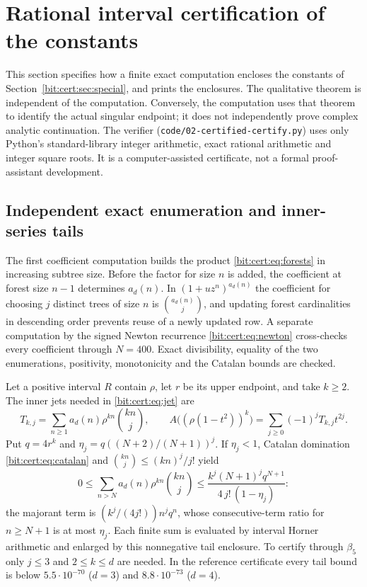 \documentclass[11pt]{article}
\theoremstyle{definition}\newtheorem{definition}[theorem]{Definition}
\theoremstyle{remark}\newtheorem{remark}[theorem]{Remark}
\begin{document}
\section{Rational interval certification of the constants}\label{bit:cert:sec:certificate}
This section specifies how a finite exact computation encloses the constants
of Section~\ref{bit:cert:sec:special}, and prints the enclosures. The
qualitative theorem is independent of the computation. Conversely, the
computation uses that theorem to identify the actual singular endpoint; it does
not independently prove complex analytic continuation. The verifier
(\texttt{code/02-certified-certify.py}) uses only Python's standard-library
integer arithmetic, exact rational arithmetic and integer square roots. It is a
computer-assisted certificate, not a formal proof-assistant development.

\subsection{Independent exact enumeration and inner-series tails}
The first coefficient computation builds the product
\eqref{bit:cert:eq:forests} in increasing subtree size. Before the factor for
size $n$ is added, the coefficient at forest size $n-1$ determines $a_d(n)$. In
$(1+uz^n)^{a_d(n)}$ the coefficient for choosing $j$ distinct trees of size $n$
is $\binom{a_d(n)}j$, and updating forest cardinalities in descending order
prevents reuse of a newly updated row. A separate computation by the signed
Newton recurrence \eqref{bit:cert:eq:newton} cross-checks every coefficient
through $N=400$. Exact divisibility, equality of the two enumerations,
positivity, monotonicity and the Catalan bounds are checked.

Let a positive interval $R$ contain $\rho$, let $r$ be its upper endpoint, and
take $k\ge2$. The inner jets needed in \eqref{bit:cert:eq:jet} are
\begin{equation}\label{bit:cert:eq:innerjet}
 T_{k,j}=\sum_{n\ge1}a_d(n)\rho^{kn}\binom{kn}j,\qquad
 A\bigl((\rho(1-t^2))^k\bigr)=\sum_{j\ge0}(-1)^jT_{k,j}t^{2j}.
\end{equation}
Put $q=4r^k$ and $\eta_j=q((N+2)/(N+1))^j$. If $\eta_j<1$, Catalan domination
\eqref{bit:cert:eq:catalan} and $\binom{kn}j\le(kn)^j/j!$ yield
\begin{equation}\label{bit:cert:eq:tail}
 0\le\sum_{n>N}a_d(n)\rho^{kn}\binom{kn}j
 \le\frac{k^j(N+1)^jq^{N+1}}{4\,j!\,(1-\eta_j)}:
\end{equation}
the majorant term is $(k^j/(4j!))n^jq^n$, whose consecutive-term ratio for
$n\ge N+1$ is at most $\eta_j$. Each finite sum is evaluated by interval
Horner arithmetic and enlarged by this nonnegative tail enclosure. To certify
through $\beta_5$ only $j\le3$ and $2\le k\le d$ are needed. In the reference
certificate every tail bound is below $5.5\cdot10^{-70}$ ($d=3$) and
$8.8\cdot10^{-73}$ ($d=4$).
\end{document}
